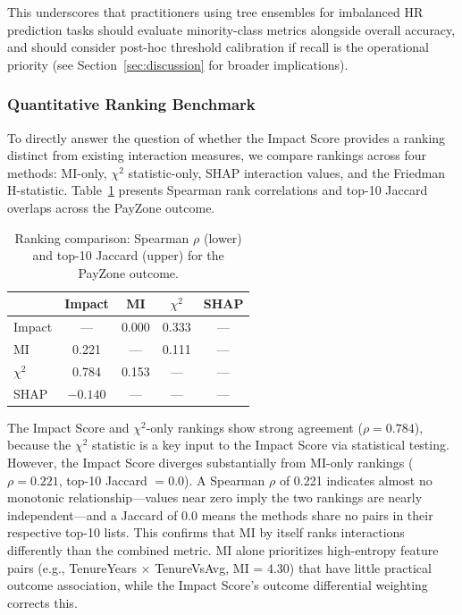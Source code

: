 \documentclass[conference]{IEEEtran}
\begin{document}
This underscores that practitioners using tree ensembles for imbalanced HR prediction tasks should evaluate minority-class metrics alongside overall accuracy, and should consider post-hoc threshold calibration if recall is the operational priority (see Section~\ref{sec:discussion} for broader implications).

\subsubsection{Quantitative Ranking Benchmark}

To directly answer the question of whether the Impact Score provides a ranking distinct from existing interaction measures, we compare rankings across four methods: MI-only, $\chi^2$ statistic-only, SHAP interaction values, and the Friedman H-statistic. Table~\ref{tab:ranking_benchmark} presents Spearman rank correlations and top-10 Jaccard overlaps across the PayZone outcome.

\begin{table}[htb]
\centering
\small
\renewcommand{\arraystretch}{1.15}
\caption{Ranking comparison: Spearman $\rho$ (lower) and top-10 Jaccard (upper) for the PayZone outcome.}
\label{tab:ranking_benchmark}
\begin{tabular}{lcccc}
\hline
 & Impact & MI & $\chi^2$ & SHAP \\
\hline
Impact & --- & 0.000 & 0.333 & --- \\
MI & 0.221 & --- & 0.111 & --- \\
$\chi^2$ & 0.784 & 0.153 & --- & --- \\
SHAP & $-0.140$ & --- & --- & --- \\
\hline
\end{tabular}
\end{table}

The Impact Score and $\chi^2$-only rankings show strong agreement ($\rho = 0.784$), because the $\chi^2$ statistic is a key input to the Impact Score via statistical testing. However, the Impact Score diverges substantially from MI-only rankings ($\rho = 0.221$, top-10 Jaccard $= 0.0$). A Spearman $\rho$ of 0.221 indicates almost no monotonic relationship---values near zero imply the two rankings are nearly independent---and a Jaccard of 0.0 means the methods share no pairs in their respective top-10 lists. This confirms that MI by itself ranks interactions differently than the combined metric. MI alone prioritizes high-entropy feature pairs (e.g., TenureYears $\times$ TenureVsAvg, MI = 4.30) that have little practical outcome association, while the Impact Score's outcome differential weighting corrects this.
\end{document}

